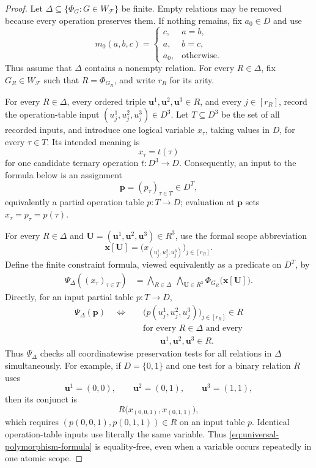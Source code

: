 \documentclass[11pt]{article}
\theoremstyle{plain}
\theoremstyle{definition}
\theoremstyle{remark}
\newcommand{\cF}{\mathcal F}
\newcommand{\SuppRel}[1]{\Phi_{#1}}
\begin{document}
\begin{proof}
Let $\Delta\subseteq\{\SuppRel G:G\in W_{\cF}\}$ be finite.  Empty
relations may be removed because every operation preserves them.  If nothing
remains, fix $a_0\in D$ and use
\[
  m_0(a,b,c)=
  \begin{cases}
    c,&a=b,\\
    a,&b=c,\\
    a_0,&\text{otherwise}.
  \end{cases}
\]
Thus assume that $\Delta$ contains a nonempty relation.  For every
$R\in\Delta$, fix $G_R\in W_{\cF}$ such that $R=\SuppRel{G_R}$, and write
$r_R$ for its arity.

For every $R\in\Delta$, every ordered triple
$\mathbf u^1,\mathbf u^2,\mathbf u^3\in R$, and every $j\in[r_R]$, record
the operation-table input $(u^1_j,u^2_j,u^3_j)\in D^3$.  Let
$T\subseteq D^3$ be the set of all recorded inputs, and introduce one
logical variable $x_\tau$, taking values in $D$, for every $\tau\in T$.
Its intended meaning is
\[
  x_\tau=t(\tau)
\]
for one candidate ternary operation $t:D^3\to D$.  Consequently, an input to
the formula below is an assignment
\[
  \mathbf p=(p_\tau)_{\tau\in T}\in D^T,
\]
equivalently a partial operation table $p:T\to D$; evaluation at $\mathbf p$
sets $x_\tau=p_\tau=p(\tau)$.

For every $R\in\Delta$ and
$\mathbf U=(\mathbf u^1,\mathbf u^2,\mathbf u^3)\in R^3$, use the formal
scope abbreviation
\[
  \mathbf x[\mathbf U]
  =\bigl(x_{(u^1_j,u^2_j,u^3_j)}\bigr)_{j\in[r_R]}.
\]
Define the finite constraint formula, viewed equivalently as a predicate on
$D^T$, by
\begin{align}
  \Psi_\Delta((x_\tau)_{\tau\in T})
  &=\bigwedge_{R\in\Delta}
    \ \bigwedge_{\mathbf U\in R^3}
    \SuppRel{G_R}\bigl(\mathbf x[\mathbf U]\bigr).
  \label{eq:universal-polymorphism-formula}
\end{align}
Directly, for an input partial table $p:T\to D$,
\begin{equation*}
\begin{aligned}
  \Psi_\Delta(\mathbf p)
  \quad\Longleftrightarrow\quad
  &\bigl(p(u^1_j,u^2_j,u^3_j)\bigr)_{j\in[r_R]}\in R\\
  &\text{for every }R\in\Delta\text{ and every}\\[-2pt]
  &\qquad \mathbf u^1,\mathbf u^2,\mathbf u^3\in R.
\end{aligned}
\end{equation*}
Thus $\Psi_\Delta$ checks all coordinatewise preservation tests for all
relations in $\Delta$ simultaneously.  For example, if $D=\{0,1\}$ and one
test for a binary relation $R$ uses
\[
  \mathbf u^1=(0,0),\qquad
  \mathbf u^2=(0,1),\qquad
  \mathbf u^3=(1,1),
\]
then its conjunct is
\[
  R\bigl(x_{(0,0,1)},x_{(0,1,1)}\bigr),
\]
which requires
$(p(0,0,1),p(0,1,1))\in R$ on an input table $p$.
Identical operation-table inputs use literally the same variable.  Thus
\eqref{eq:universal-polymorphism-formula} is equality-free, even when a
variable occurs repeatedly in one atomic scope.


\end{proof}
\end{document}
